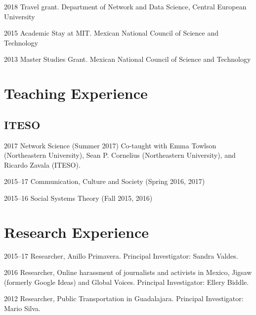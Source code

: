 \documentclass{academiccv}
\begin{document}
\begin{tablist}

\item[2018] \tab Travel grant. Department of Network and Data Science, Central European University

\item[2015] \tab Academic Stay at MIT. Mexican National Council of Science and Technology 

\item[2013] \tab Master Studies Grant. Mexican National Council of Science and Technology

\end{tablist}



\section*{Teaching Experience}

\subsection*{ITESO}

\begin{tablist}
	
	\item[2017]	\tab Network Science (Summer 2017) Co-taught with Emma Towlson (Northeastern University), Sean P. Cornelius (Northeastern University), and Ricardo Zavala (ITESO).
	
	\item [2015--17]\tab Communication, Culture and Society (Spring 2016, 2017)
	
	\item [2015--16]\tab Social Systems Theory (Fall 2015, 2016)
	
	
\end{tablist}

\section*{Research Experience}

\begin{tablist}
	
\item[2015--17] 	\tab Researcher, Anillo Primavera. Principal Investigator: Sandra Valdes.

\item[2016] 	\tab Researcher, Online harassment of journalists and activists in Mexico, Jigsaw (formerly Google Ideas) and Global Voices. Principal Investigator: Ellery Biddle.

\item[2012] \tab Researcher, Public Transportation in Guadalajara. Principal Investigator: Mario Silva.

\end{tablist}
\end{document}
